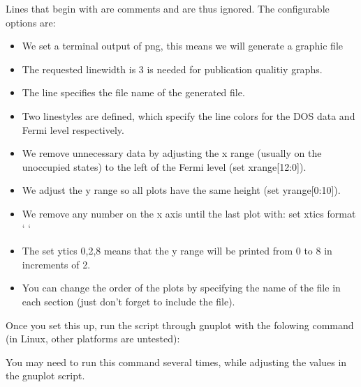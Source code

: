\documentclass[letterpaper,10pt,english,openany,oneside]{sphinxmanual}
\begin{document}
\sphinxAtStartPar
Lines that begin with \sphinxstyleemphasis{\#} are comments and are thus ignored. The configurable options are:
\begin{itemize}
\item {} 
\sphinxAtStartPar
We set a terminal output of png, this means we will generate a  graphic file

\item {} 
\sphinxAtStartPar
The requested linewidth is 3 is needed for publication qualitiy graphs.

\item {} 
\sphinxAtStartPar
The  line specifies the file name of the generated file.

\item {} 
\sphinxAtStartPar
Two linestyles are defined, which specify the line colors for the DOS data and Fermi level respectively.

\item {} 
\sphinxAtStartPar
We remove unnecessary data by adjusting the x range (usually on the unoccupied states) to the left of the Fermi level (set xrange{[}\sphinxhyphen{}12:0{]}).

\item {} 
\sphinxAtStartPar
We adjust the y range so all plots have the same height (set yrange{[}0:10{]}).

\item {} 
\sphinxAtStartPar
We remove any number on the x axis until the last plot with: set xtics format ‘ ‘

\item {} 
\sphinxAtStartPar
The set ytics 0,2,8 means that the y range will be printed from 0 to 8 in increments of 2.

\item {} 
\sphinxAtStartPar
You can change the order of the plots by specifying the name of the  file in each section (just don’t forget to include the  file).

\end{itemize}

\sphinxAtStartPar
Once you set this up, run the script through gnuplot with the folowing command (in Linux, other platforms are untested):

\sphinxAtStartPar
{}

\sphinxAtStartPar
You may need to run this command several times, while adjusting the values in the gnuplot script.
\end{document}
